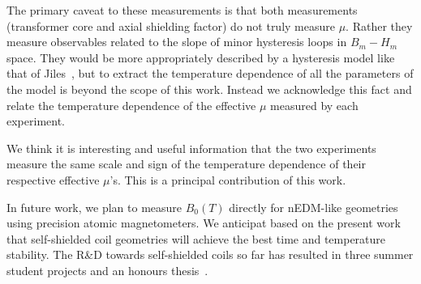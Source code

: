 The primary caveat to these measurements is that both measurements
(transformer core and axial shielding factor) do not truly measure
$\mu$.  Rather they measure observables related to the slope of minor
hysteresis loops in $B_m-H_m$ space.  They would be more appropriately
described by a hysteresis model like that of
Jiles~\cite{jiles1994frequency}, but to extract the temperature
dependence of all the parameters of the model is beyond the scope of
this work.  Instead we acknowledge this fact and relate the
temperature dependence of the effective $\mu$ measured by each
experiment.

We think it is interesting and useful information that the two
experiments measure the same scale and sign of the temperature
dependence of their respective effective $\mu$'s.  This is a principal
contribution of this work.

In future work, we plan to measure $B_0(T)$ directly for nEDM-like
geometries using precision atomic magnetometers.  We anticipat based
on the present work that self-shielded coil geometries will achieve
the best time and temperature stability. The R\&D towards
self-shielded coils so far has resulted in three summer student
projects and an honours thesis~\cite{Rosie_thesis}.















